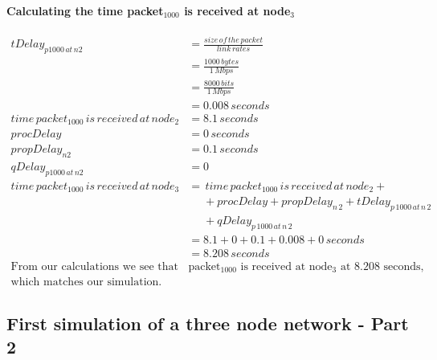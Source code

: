 \documentclass[fleqn,11pt]{article}
\begin{document}
\paragraph{Calculating the time packet$_{1000}$ is received at node$_3$ }
\begin{align*}
tDelay_{p1000\,at\,n2} &=  \frac{size\,of\,the\,packet} {link\,rates}\\
&= \frac{1000\,bytes} {1\,Mbps}\\
&=  \frac{8000\,bits} {1\,Mbps}\\
&= 0.008 \,seconds\\
time\,packet_{1000}\,is\,received\,at\,node_{2} &= 8.1\,seconds\\
procDelay &= 0\,seconds\\
propDelay_{n2} &= 0.1\,seconds\\
qDelay_{p1000\,at\,n2} &= 0\\
time\,packet_{1000}\,is\,received\,at\,node_{3} &= \,time\,packet_{1000}\,is\,received\,at\,node_{2} + \\
&\,\,\,\,\,\,\,\, + procDelay + propDelay_{n\,2} + tDelay_{p\,1000\,at\,n\,2} \\
&\,\,\,\,\,\,\,\, + qDelay_{p\,1000\,at\,n\,2}\\
&= 8.1 + 0 + 0.1 + 0.008 + 0\,seconds\\
&= 8.208\,seconds \\
\text{From our calculations we see that }
&\text{packet$_{1000}$ is received at node$_3$ at 8.208 seconds,} \\
\text{which matches our simulation.}
\end{align*}
\subsection{First simulation of a three node network - Part 2}
\end{document}
